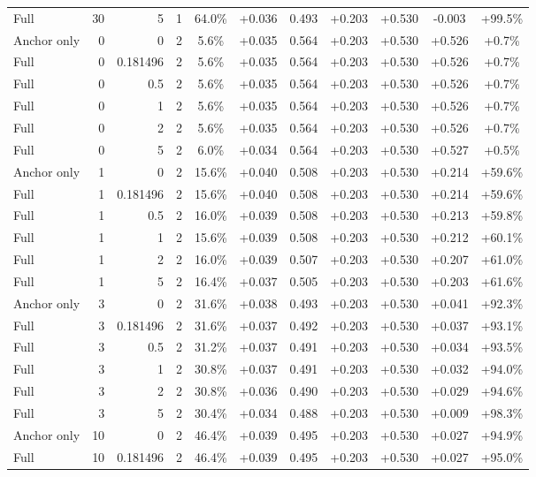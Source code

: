 \begin{table}[htbp]
\begin{tabular}{lrrrccccccc}
Full & 30 & 5 & 1 & 64.0\% & +0.036 & 0.493 & +0.203 & +0.530 & -0.003 & +99.5\% \\
Anchor only & 0 & 0 & 2 & 5.6\% & +0.035 & 0.564 & +0.203 & +0.530 & +0.526 & +0.7\% \\
Full & 0 & 0.181496 & 2 & 5.6\% & +0.035 & 0.564 & +0.203 & +0.530 & +0.526 & +0.7\% \\
Full & 0 & 0.5 & 2 & 5.6\% & +0.035 & 0.564 & +0.203 & +0.530 & +0.526 & +0.7\% \\
Full & 0 & 1 & 2 & 5.6\% & +0.035 & 0.564 & +0.203 & +0.530 & +0.526 & +0.7\% \\
Full & 0 & 2 & 2 & 5.6\% & +0.035 & 0.564 & +0.203 & +0.530 & +0.526 & +0.7\% \\
Full & 0 & 5 & 2 & 6.0\% & +0.034 & 0.564 & +0.203 & +0.530 & +0.527 & +0.5\% \\
Anchor only & 1 & 0 & 2 & 15.6\% & +0.040 & 0.508 & +0.203 & +0.530 & +0.214 & +59.6\% \\
Full & 1 & 0.181496 & 2 & 15.6\% & +0.040 & 0.508 & +0.203 & +0.530 & +0.214 & +59.6\% \\
Full & 1 & 0.5 & 2 & 16.0\% & +0.039 & 0.508 & +0.203 & +0.530 & +0.213 & +59.8\% \\
Full & 1 & 1 & 2 & 15.6\% & +0.039 & 0.508 & +0.203 & +0.530 & +0.212 & +60.1\% \\
Full & 1 & 2 & 2 & 16.0\% & +0.039 & 0.507 & +0.203 & +0.530 & +0.207 & +61.0\% \\
Full & 1 & 5 & 2 & 16.4\% & +0.037 & 0.505 & +0.203 & +0.530 & +0.203 & +61.6\% \\
Anchor only & 3 & 0 & 2 & 31.6\% & +0.038 & 0.493 & +0.203 & +0.530 & +0.041 & +92.3\% \\
Full & 3 & 0.181496 & 2 & 31.6\% & +0.037 & 0.492 & +0.203 & +0.530 & +0.037 & +93.1\% \\
Full & 3 & 0.5 & 2 & 31.2\% & +0.037 & 0.491 & +0.203 & +0.530 & +0.034 & +93.5\% \\
Full & 3 & 1 & 2 & 30.8\% & +0.037 & 0.491 & +0.203 & +0.530 & +0.032 & +94.0\% \\
Full & 3 & 2 & 2 & 30.8\% & +0.036 & 0.490 & +0.203 & +0.530 & +0.029 & +94.6\% \\
Full & 3 & 5 & 2 & 30.4\% & +0.034 & 0.488 & +0.203 & +0.530 & +0.009 & +98.3\% \\
Anchor only & 10 & 0 & 2 & 46.4\% & +0.039 & 0.495 & +0.203 & +0.530 & +0.027 & +94.9\% \\
Full & 10 & 0.181496 & 2 & 46.4\% & +0.039 & 0.495 & +0.203 & +0.530 & +0.027 & +95.0\% \\

\end{tabular}
\end{table}
